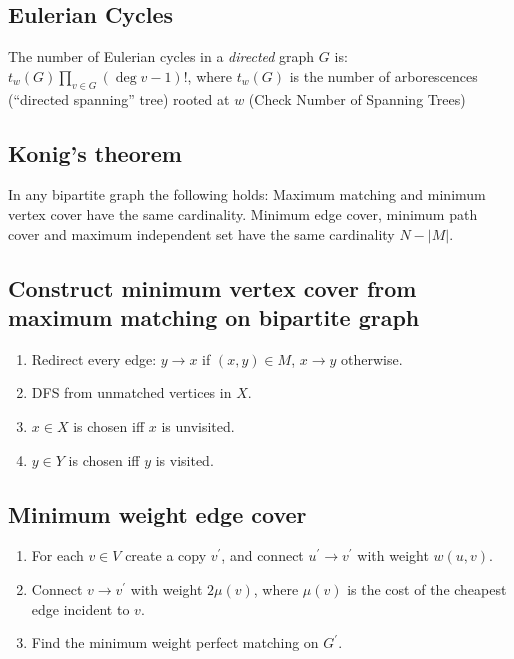 \subsection{Eulerian Cycles}
The number of Eulerian cycles in a \emph{directed} graph $G$ is: $t_w(G) \prod_{v \in G} (\deg v - 1)!$,
where $t_w(G)$ is the number of arborescences (``directed spanning'' tree) rooted at $w$
(Check Number of Spanning Trees)\\


\subsection{Konig's theorem}
In any bipartite graph the following holds: Maximum matching and minimum vertex cover have the same cardinality.
Minimum edge cover, minimum path cover and maximum independent set have the same cardinality $N - |M|$.\\

\subsection{Construct minimum vertex cover from maximum matching on bipartite graph}
\vspace{-0.2em}
\begin{enumerate}
	\itemsep-0.8em
	\item Redirect every edge: $y \rightarrow x$ if $(x, y) \in M$, $x \rightarrow y$ otherwise.
	\item DFS from unmatched vertices in $X$.
	\item $x \in X$ is chosen iff $x$ is unvisited.
	\item $y \in Y$ is chosen iff $y$ is visited.
\end{enumerate}

\subsection{Minimum weight edge cover}
\vspace{-0.2em}
    \begin{enumerate}
	  \itemsep-0.8em
      \item For each $v \in V$ create a copy $v^\prime$, and connect $u^\prime \to v^\prime$ with weight $w(u, v)$.
      \item Connect $v \to v^\prime$ with weight $2\mu(v)$, where $\mu(v)$ is the cost of the cheapest edge incident to $v$.
      \item Find the minimum weight perfect matching on $G^\prime$.
    \end{enumerate}

